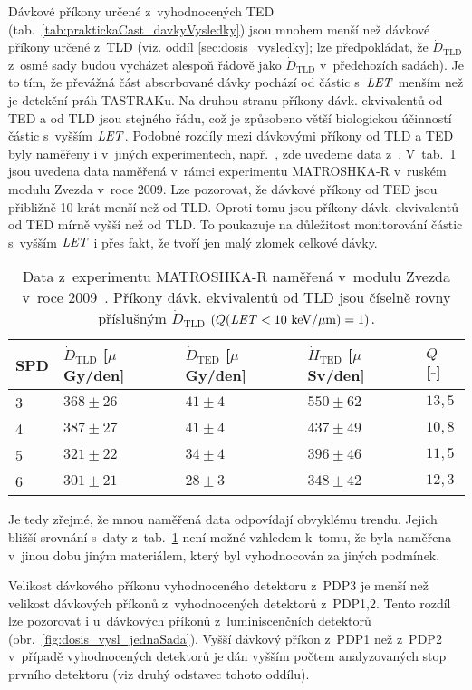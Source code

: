 Dávkové příkony určené z~vyhodnocených TED (tab.~\ref{tab:praktickaCast_davkyVysledky}) jsou mnohem menší než dávkové příkony určené z~TLD (viz. oddíl \ref{sec:dosis_vysledky}; lze předpokládat, že $\dot{D}_{\text{TLD}}$ z~osmé sady budou vycházet alespoň řádově jako $\dot{D}_{\text{TLD}}$ v~předchozích sadách). Je to tím, že převážná část absorbované dávky pochází od částic s~$\mathit{LET}$ menším než je detekční práh TASTRAKu. Na druhou stranu příkony dávk. ekvivalentů od TED a od TLD jsou stejného řádu, což je způsobeno větší biologickou účinností částic s~vyšším $\mathit{LET}$. Podobné rozdíly mezi dávkovými příkony od TLD a TED byly naměřeny i v~jiných experimentech, např.~\cite{japonsky,passDetectors,ambrozova_dvaExperimenty}, zde uvedeme data z~\cite{passDetectors}. V~tab.~\ref{tab:praktickaCast_rozdilyJinyExp} jsou uvedena data naměřená v~rámci experimentu MATROSHKA-R
v~ruském modulu Zvezda v~roce 2009. Lze pozorovat, že dávkové příkony od TED jsou přibližně 10-krát menší než od TLD. Oproti tomu jsou příkony dávk. ekvivalentů od TED mírně vyšší než od TLD. To poukazuje na důležitost monitorování částic s~vyšším $\mathit{LET}$ i přes fakt, že tvoří jen malý zlomek celkové dávky.
\begin{table}[h]
  \centering
  \caption{Data z~experimentu MATROSHKA-R naměřená v~modulu Zvezda v~roce 2009~\cite{passDetectors}. Příkony dávk. ekvivalentů od TLD jsou číselně rovny příslušným $\dot{D}_{\text{TLD}}$ $(Q(\mathit{LET}<\nobreak10\ \mathrm{keV/\mu m})=1)$.}
  \label{tab:praktickaCast_rozdilyJinyExp}
  \begin{tabular}{lllll}
	\toprule
	SPD&$\dot{D}_{\text{TLD}}$ [$\mu$Gy/den]&$\dot{D}_{\text{TED}}$ [$\mu$Gy/den]&$\dot{H}_{\text{TED}}$ [$\mu$Sv/den]&$Q$ [-]\\
	\midrule
	3&$368\pm26$&$41\pm4$&$550\pm62$&$13,5$\\
	4&$387\pm27$&$41\pm4$&$437\pm49$&$10,8$\\
	5&$321\pm22$&$34\pm4$&$396\pm46$&$11,5$\\
	6&$301\pm21$&$28\pm3$&$348\pm42$&$12,3$\\
	\bottomrule
  \end{tabular}
\end{table}
Je tedy zřejmé, že mnou naměřená data odpovídají obvyklému trendu. Jejich bližší srovnání s~daty z~tab.~\ref{tab:praktickaCast_rozdilyJinyExp} není možné vzhledem k~tomu, že byla naměřena v~jinou dobu jiným materiálem, který byl vyhodnocován za jiných podmínek. 

Velikost dávkového příkonu vyhodnoceného detektoru z~PDP3 je menší než velikost dávkových příkonů z~vyhodnocených detektorů z~PDP1,2. Tento rozdíl lze pozorovat i u~dávkových příkonů z~luminiscenčních detektorů (obr.~\ref{fig:dosis_vysl_jednaSada}). Vyšší dávkový příkon z~PDP1 než z~PDP2 v~případě vyhodnocených detektorů je dán vyšším počtem analyzovaných stop prvního detektoru (viz druhý odstavec tohoto oddílu).

